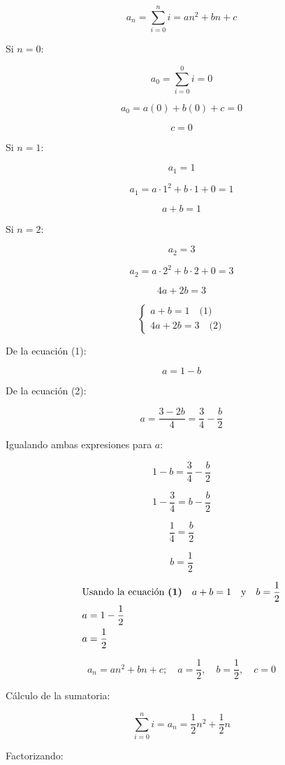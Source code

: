 \[
a_n = \sum_{i=0}^{n} i = a n^2 + b n + c
\]

Si \( n = 0 \):

\[
a_0 = \sum_{i=0}^{0} i = 0
\]

\[
a_0 = a(0) + b(0) + c = 0
\]

\[
c = 0
\]


Si \( n = 1 \):

\[
a_1 = 1
\]

\[
a_1 = a \cdot 1^2 + b \cdot 1 + 0 = 1
\]

\[
a + b = 1
\]

Si \( n = 2 \):

\[
a_2 = 3
\]

\[
a_2 = a \cdot 2^2 + b \cdot 2 + 0 = 3
\]

\[
4a + 2b = 3
\]

\[
\begin{cases}
a + b = 1 \quad \text{(1)} \\
4a + 2b = 3 \quad \text{(2)}
\end{cases}
\]

De la ecuación (1):

\[
a = 1 - b
\]

De la ecuación (2):

\[
a = \frac{3 - 2b}{4} = \frac{3}{4} - \frac{b}{2}
\]

Igualando ambas expresiones para \( a \):

\[
1 - b = \frac{3}{4} - \frac{b}{2}
\]

\[
1 - \frac{3}{4} = b - \frac{b}{2}
\]

\[
\frac{1}{4} = \frac{b}{2}
\]

\[
b = \frac{1}{2}
\]

\begin{equation*}
    \begin{aligned}
    &\text{Usando la ecuación \textbf{(1)}} \quad a + b = 1 \quad \text{y} \quad b = \frac{1}{2} \\
    &a = 1 - \frac{1}{2} \\
    &a = \frac{1}{2}
    \end{aligned}
\end{equation*}

\[
a_n = a n^2 + b n + c ; \quad a = \frac{1}{2}, \quad b = \frac{1}{2}, \quad c = 0
\]

Cálculo de la sumatoria:

\[
\sum_{i=0}^{n} i = a_n = \frac{1}{2} n^2 + \frac{1}{2} n
\]

Factorizando:

